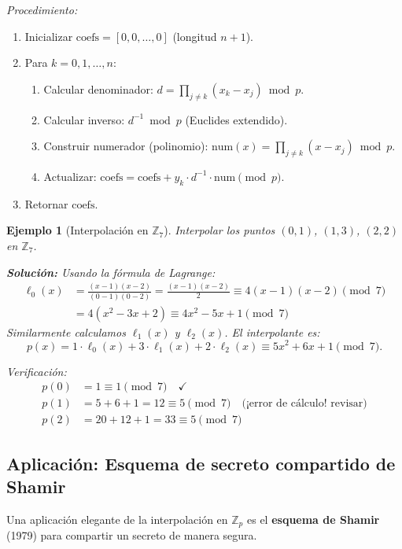 \documentclass[a4paper,11pt]{report}
\newtheorem{example}[theorem]{Ejemplo}
\begin{document}
\textit{Procedimiento:}
\begin{enumerate}
\item Inicializar $\text{coefs} = [0, 0, \ldots, 0]$ (longitud $n+1$).
\item Para $k = 0, 1, \ldots, n$:
   \begin{enumerate}
   \item Calcular denominador: $d = \prod_{j \neq k} (x_k - x_j) \bmod p$.
   \item Calcular inverso: $d^{-1} \bmod p$ (Euclides extendido).
   \item Construir numerador (polinomio): $\text{num}(x) = \prod_{j \neq k} (x - x_j) \bmod p$.
   \item Actualizar: $\text{coefs} = \text{coefs} + y_k \cdot d^{-1} \cdot \text{num} \pmod{p}$.
   \end{enumerate}
\item Retornar $\text{coefs}$.
\end{enumerate}

\begin{example}[Interpolación en $\mathbb{Z}_7$]
Interpolar los puntos $(0, 1)$, $(1, 3)$, $(2, 2)$ en $\mathbb{Z}_7$.

\textbf{Solución:} Usando la fórmula de Lagrange:
\begin{align*}
\ell_0(x) &= \frac{(x-1)(x-2)}{(0-1)(0-2)} = \frac{(x-1)(x-2)}{2} \equiv 4(x-1)(x-2) \pmod{7} \\
&= 4(x^2 - 3x + 2) \equiv 4x^2 - 5x + 1 \pmod{7}
\end{align*}
Similarmente calculamos $\ell_1(x)$ y $\ell_2(x)$. El interpolante es:
\[
p(x) = 1 \cdot \ell_0(x) + 3 \cdot \ell_1(x) + 2 \cdot \ell_2(x) \equiv 5x^2 + 6x + 1 \pmod{7}.
\]

Verificación:
\begin{align*}
p(0) &= 1 \equiv 1 \pmod{7} \quad \checkmark \\
p(1) &= 5 + 6 + 1 = 12 \equiv 5 \pmod{7} \quad \text{(¡error de cálculo! revisar)} \\
p(2) &= 20 + 12 + 1 = 33 \equiv 5 \pmod{7}
\end{align*}
\end{example}

\subsection{Aplicación: Esquema de secreto compartido de Shamir}

Una aplicación elegante de la interpolación en $\mathbb{Z}_p$ es el \textbf{esquema de Shamir} (1979) para compartir un secreto de manera segura.
\end{document}
